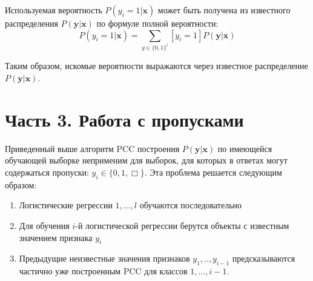\documentclass{ITaSconf}
\newcommand{\x}{\mathbf{x}}
\newcommand{\y}{\mathbf{y}}
\begin{document}
Используемая вероятность $P(y_i=1|\x)$ может быть получена из известного распределения $P(\y|\x)$ по формуле полной вероятности:
$$P(y_i=1|\x)=\sum\limits_{y\in \{0,1\}^l}[y_i=1]P(\y|\x)$$

Таким образом, искомые вероятности выражаются через известное распределение $P(\y|\x)$.

\section{Часть 3. Работа с пропусками}
Приведенный выше алгоритм PCC построения $P(\y|\x)$ по имеющейся обучающей выборке неприменим для выборок, для которых в ответах могут содержаться пропуски: $y_i\in\{0,1,\Box\}$. Эта проблема решается следующим образом:
\begin{enumerate}
\item Логистические регрессии $1,...,l$ обучаются последовательно
\item Для обучения $i$-й логистической регрессии берутся объекты с известным значением признака $y_i$
\item Предыдущие неизвестные значения признаков $y_1,..,y_{i-1}$ предсказываются частично уже построенным PCC для классов $1,...,{i-1}$.
\end{enumerate}
\end{document}
